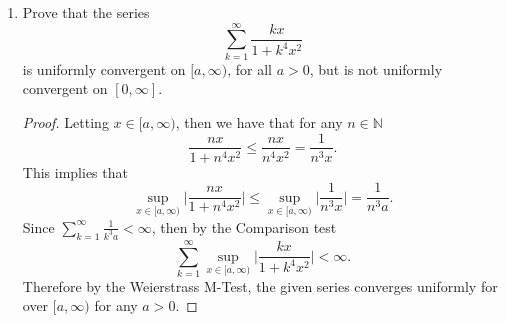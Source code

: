 \documentclass[12pt]{article}
\newenvironment{solution}
{\renewcommand\qedsymbol{$\blacksquare$}\begin{proof}[Solution]}
{\end{proof}}
\begin{document}
\begin{enumerate}
\begin{solution}
                Letting $\varepsilon=1/9$, $m\in\mathbb{N}$, $x=1/m\in[0, 1]$,
                and $n=2m$, then we have that 
                \begin{align*}
                    \sum_{k=m}^{n}\frac{kx}{1+k^3x^2}
                    &=\sum_{k=m}^{2m}\frac{k(\frac{1}{m})}{1+\frac{k^3}{m^2}}
                    \\
                    &=\sum_{k=m}^{2m}\frac{m k}{m^2+k^3} \\
                    &\geq\sum_{k=m}^{2m}\frac{m\cdot m}{m^2+(2m)^3} \\
                    &=\sum_{k=m}^{2m}\frac{m^2}{m^2+8m^3} \\
                    &=\frac{m^2(2m-m)}{m^2+8m^3} \\
                    &\geq \frac{m^3}{m^3+8m^3} \\
                    &=\frac{m^3}{9m^3} \\
                    &=\frac{1}{9}=\varepsilon.
                \end{align*}
                Therefore the series is not uniformly convergent on $[0, 1]$. 
            \end{solution}
        \item Prove that the series
            \begin{equation*}
                \sum_{k=1}^{\infty}\frac{kx}{1+k^4x^2}
            \end{equation*}
            is uniformly convergent on $[a, \infty)$, for all $a>0$, but is not
            uniformly convergent on $[0, \infty]$. 
            \begin{proof}
                Letting $x\in[a, \infty)$, then we have that for any
                $n\in\mathbb{N}$
                \begin{equation*}
                    \frac{nx}{1+n^4x^2}\leq\frac{nx}{n^4x^2}=\frac{1}{n^3x}.
                \end{equation*}
                This implies that 
                \begin{equation*}
                    \sup_{x\in[a,
                    \infty)}\bigg|\frac{nx}{1+n^4x^2}\bigg|\leq\sup_{x\in[a,
                    \infty)}\bigg|\frac{1}{n^3x}\bigg|=\frac{1}{n^3a}.
                \end{equation*}
                Since $\sum_{k=1}^{\infty}\frac{1}{k^3a}<\infty$, then by the
                Comparison test
                \begin{equation*}
                    \sum_{k=1}^{\infty}\sup_{x\in[a,
                    \infty)}\bigg|\frac{kx}{1+k^4x^2}\bigg|<\infty.
                \end{equation*}
                Therefore by the Weierstrass M-Test, the given series converges
                uniformly for over $[a, \infty)$ for any $a>0$. 
            \end{proof}
    \end{enumerate}
\end{document}
